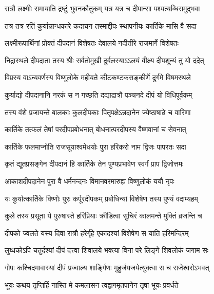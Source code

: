 \twolineshloka
{रात्रौ लक्ष्मीः समायाति द्रष्टुं भुवनकौतुकम्}
{यत्र यत्र च दीपान्सा पश्यत्यब्धिसमुद्भवा} %

\twolineshloka
{तत्र तत्र रतिं कुर्यान्नान्धकारे कदाचन}
{तस्माद्दीपः स्थापनीयः कार्तिके मासि वै सदा} %

\twolineshloka
{लक्ष्मीरूपार्थिनां प्रोक्तं दीपदानं विशेषतः}
{देवालये नदीतीरे राजमार्गे विशेषतः} %

\twolineshloka
{निद्रास्थले दीपदाता तस्य श्रीः सर्वतोमुखी}
{दुर्बलस्याऽऽलयं वीक्ष्य दीपशून्यं तु यो ददेत्} %

\twolineshloka
{विप्रस्य वाऽन्यवर्णस्य विष्णुलोके महीयते}
{कीटकण्टकसङ्कीर्णे दुर्गमे विषमस्थले} %

\twolineshloka
{कुर्याद्यो दीपदानानि नरकं स न गच्छति}
{दद्याद्रात्रौ पञ्चनदे दीपं यो विधिपूर्वकम्} %

\twolineshloka
{तस्य वंशे प्रजायन्ते बालकाः कुलदीपकाः}
{पितृपक्षेऽन्नदानेन ज्येष्ठाषाढे च वारिणा} %

\twolineshloka
{कार्तिके तत्फलं तेषां परदीपप्रबोधनात्}
{बोधनात्परदीपस्य वैष्णवानां च सेवनात्} %

\twolineshloka
{कार्तिके फलमाप्नोति राजसूयाश्वमेधयोः}
{पुरा हरिकरो नाम द्विजः पापरतः सदा} %

\twolineshloka
{कृतं द्यूतप्रसङ्गेन दीपदानं हि कार्तिके}
{तेन पुण्यप्रभावेण स्वर्गं प्राप द्विजोत्तमः} %

\twolineshloka
{आकाशदीपदानेन पुरा वै धर्मनन्दनः}
{विमानवरमारुह्य विष्णुलोकं ययौ नृपः} %

\twolineshloka
{यः कुर्यात्कार्तिके विष्णोः पुरः कर्पूरदीपकम्}
{प्रबोधिन्यां विशेषेण तस्य पुण्यं वदाम्यहम्} %

\twolineshloka
{कुले तस्य प्रसूता ये पुरुषास्ते हरिप्रियाः}
{क्रीडित्वा सुचिरं कालमन्ते मुक्तिं व्रजन्ति च} %

\twolineshloka
{दीपको ज्वलते यस्य दिवा रात्रौ हरेर्गृहे}
{एकादश्यां विशेषेण स याति हरिमन्दिरम्} %

\twolineshloka
{लुब्धकोऽपि चतुर्दश्यां दीपं दत्त्वा शिवालये}
{भक्त्या विना परे लिङ्गे शिवलोकं जगाम सः} %

\twolineshloka
{गोपः कश्चिदमावास्यां दीपं प्रज्वाल्य शार्ङ्गिणः}
{मुहुर्जयजयेत्युक्त्वा स च राजेश्वरोऽभवत्} %





\twolineshloka
{भूयः कथय तृप्तिर्हि नास्ति मे कमलासन}
{त्वद्वागमृतपानेन तृषा भूयः प्रवर्धते} %


